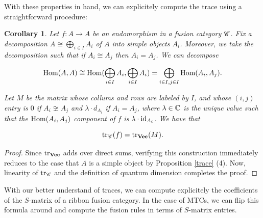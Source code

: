 \documentclass{article}
\newtheorem{corollary}{Corollary}[section]
\theoremstyle{definition}
\numberwithin{figure}{section}
\begin{document}
With these properties in hand, we can explicitely compute the trace using a straightforward procedure:

\begin{corollary}\label{explicit-trace} Let $f:A\to A$ be an endomorphism in a fusion category $\mathscr{C}$. Fix a decomposition $A\cong \bigoplus_{i\in I}A_i$ of $A$ into simple objects $A_i$. Moreover, we take the decomposition such that if $A_i\cong A_j$ then $A_i=A_j$. We can decompose

$$\mathrm{Hom}(A,A)\cong \mathrm{Hom}(\bigoplus_{i\in I} A_i,\bigoplus_{i\in I}A_i)=\bigoplus_{i\in I, j\in I}\mathrm{Hom}(A_i,A_j).$$

Let $M$ be the matrix whose collums and rows are labeled by $I$, and whose $(i,j)$ entry is $0$ if $A_i\not\cong A_j$ and $\lambda \cdot d_{A_i}$ if $A_i=A_j$, where $\lambda\in \mathbb{C}$ is the unique value such that the $\mathrm{Hom}(A_i,A_j)$ component of $f$ is $\lambda\cdot \mathrm{id}_{A_i}$. We have that

$$\mathrm{tr}_{\mathscr{C}}(f)=\mathrm{tr}_{\bold{Vec}}(M).$$

\end{corollary}
\begin{proof} Since $\mathrm{tr}_{\bold{Vec}}$ adds over direct sums, verifying this construction immediately reduces to the case that $A$ is a simple object by Proposition \ref{trace} (4). Now, linearity of $\mathrm{tr}_{\mathscr{C}}$ and the definition of quantum dimension completes the proof.
\end{proof}

With our better understand of traces, we can compute explicitely the coefficients of the $S$-matrix of a ribbon fusion category. In the case of MTCs, we can flip this formula around and compute the fusion rules in terms of $S$-matrix entries.
\end{document}
